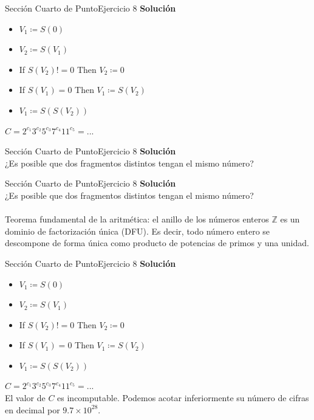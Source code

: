 \documentclass[10pt, envcountsect, presentation, aspectratio=169]{beamer}
\begin{document}

\begin{frame}{Sección Cuarto de Punto}{Ejercicio 8}
    \textbf{Solución}\\
    \begin{itemize}
        \item[] $V_1 \coloneqq S(0)$
        \item[] $V_2 \coloneqq S(V_1)$
        \item[] If $S(V_2)!=0$ Then $V_2 \coloneqq0$
        \item[] If $S(V_1)=0$ Then $V_1 \coloneqq S(V_2)$
        \item[] $V_1 \coloneqq S(S(V_2))$
    \end{itemize}
    $C = 2^{c_1} 3^{c_2} 5^{c_3} 7^{c_4} 11^{c_5} = ...$
\end{frame}


\begin{frame}{Sección Cuarto de Punto}{Ejercicio 8}
    \textbf{Solución}\\
    ¿Es posible que dos fragmentos distintos tengan el mismo número?
\end{frame}


\begin{frame}{Sección Cuarto de Punto}{Ejercicio 8}
    \textbf{Solución}\\
    ¿Es posible que dos fragmentos distintos tengan el mismo número?\\~\\
    Teorema fundamental de la aritmética: el anillo de los números enteros $\mathbb{Z}$ es un dominio de factorización única (DFU).
    Es decir, todo número entero se descompone de forma única como producto de potencias de primos y una unidad. 
\end{frame}


\begin{frame}{Sección Cuarto de Punto}{Ejercicio 8}
    \textbf{Solución}\\
    \begin{itemize}
        \item[] $V_1 \coloneqq S(0)$
        \item[] $V_2 \coloneqq S(V_1)$
        \item[] If $S(V_2)!=0$ Then $V_2 \coloneqq0$
        \item[] If $S(V_1)=0$ Then $V_1 \coloneqq S(V_2)$
        \item[] $V_1 \coloneqq S(S(V_2))$
    \end{itemize}
    $C = 2^{c_1} 3^{c_2} 5^{c_3} 7^{c_4} 11^{c_5} = ...$\\
    El valor de $C$ es incomputable. Podemos acotar inferiormente su número de cifras en decimal por $9.7 \times 10^{28}$.
\end{frame}
\end{document}

